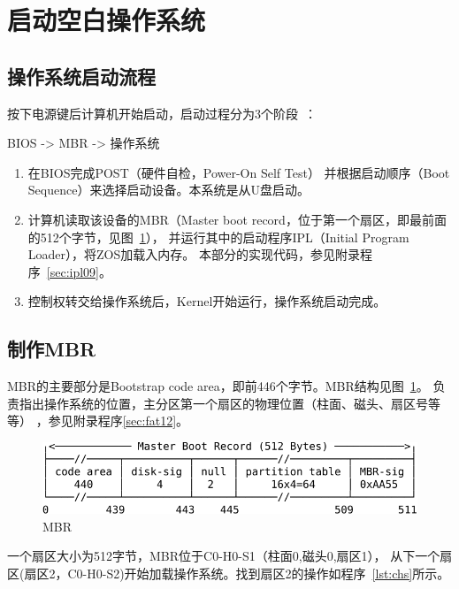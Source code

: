 \section{启动空白操作系统}

\subsection{操作系统启动流程}

按下电源键后计算机开始启动，启动过程分为3个阶段~\cite{阮一峰2014如何变得有思想}：
\begin{center}BIOS -> MBR -> 操作系统\end{center}

\begin{enumerate}
\item 在BIOS完成POST（硬件自检，Power-On Self Test）
  并根据启动顺序（Boot Sequence）来选择启动设备。本系统是从U盘启动。
\item 计算机读取该设备的MBR（Master boot record，位于第一个扇区，即最前面的512个字节，见图~\ref{fig:mbr}），
  并运行其中的启动程序IPL（Initial Program Loader），将ZOS加载入内存。
  本部分的实现代码，参见附录程序~\ref{sec:ipl09}。
\item 控制权转交给操作系统后，Kernel开始运行，操作系统启动完成。
\end{enumerate}

\subsection{制作MBR}

MBR的主要部分是Bootstrap code area，即前446个字节。MBR结构见图~\ref{fig:mbr}。
负责指出操作系统的位置，主分区第一个扇区的物理位置（柱面、磁头、扇区号等等）
，参见附录程序\ref{sec:fat12}。

\begin{figure}[H]
  \centering
  \includegraphics[width=1\textwidth]{../Fig/mbr.pdf}
  \caption{MBR}
  \label{fig:mbr}
\end{figure}

一个扇区大小为512字节，MBR位于C0-H0-S1（柱面0,磁头0,扇区1），\cite{刘伟2010数据恢复技术深度揭秘}
从下一个扇区(扇区2，C0-H0-S2)开始加载操作系统。找到扇区2的操作如程序~\ref{lst:chs}所示。

